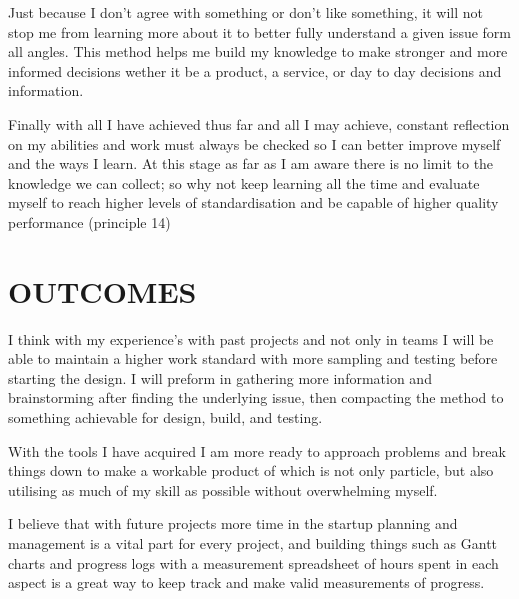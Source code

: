 \documentclass[a4paper, 10pt]{IEEEconf}
\begin{document}
Just because I don't agree with something or don't like something, it will not stop me from learning more about it to better fully understand a given issue form all angles. This method helps me build my knowledge to make stronger and more informed decisions wether it be a product, a service, or day to day decisions and information.

Finally with all I have achieved thus far and all I may achieve, constant reflection on my abilities and work must always be checked so I can better improve myself and the ways I learn. At this stage as far as I am aware there is no limit to the knowledge we can collect; so why not keep learning all the time and evaluate myself to reach higher levels of standardisation and be capable of higher quality performance (principle 14)



%



\section{OUTCOMES}



I think with my experience's with past projects and not only in teams I will be able to maintain a higher work standard with more sampling and testing before starting the design. I will preform in gathering more information and brainstorming after finding the underlying issue, then compacting the method to something achievable for design, build, and testing.

With the tools I have acquired I am more ready to approach problems and break things down to make a workable product of which is not only particle, but also utilising as much of my skill as possible without overwhelming myself. 

I believe that with future projects more time in the startup planning and management is a vital part for every project, and building things such as Gantt charts and progress logs with a measurement spreadsheet of hours spent in each aspect is a great way to keep track and make valid measurements of progress.
\end{document}
